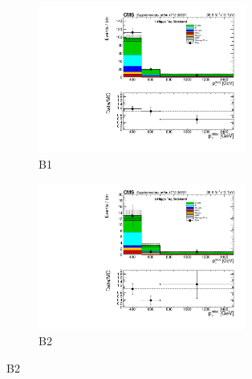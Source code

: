 \begin{figure}[htbp]

\begin{subfigure}[b]{0.5\textwidth}
\begin{centering}
\includegraphics[width=0.75\textwidth]{figs/Unblinding_tagSB.pdf}
\caption{B1}
\end{centering}
\end{subfigure}
\begin{subfigure}[b]{0.5\textwidth}
\begin{centering}
\includegraphics[width=0.75\textwidth]{figs/Unblinding_doubletagSB.pdf}
\caption{B2}
\end{centering}
\end{subfigure}

\vspace{0.25cm}


\end{figure}

